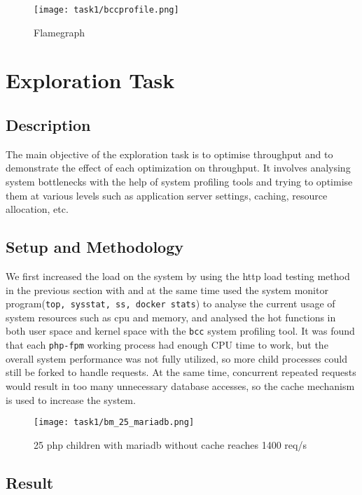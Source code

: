 \begin{figure}
\centering 
\texttt{[image: task1/bccprofile.png]}
\caption{Flamegraph} 
\label{flamegraph}
\end{figure}

\section{Exploration Task}

\subsection{Description}

The main objective of the exploration task is to optimise throughput and to demonstrate the effect of each optimization on throughput. It involves analysing system bottlenecks with the help of system profiling tools and trying to optimise them at various levels such as application server settings, caching, resource allocation, etc.

\subsection{Setup and Methodology}

We first increased the load on the system by using the http load testing method in the previous section with  and at the same time used the system monitor program(\texttt{top, sysstat, ss, docker stats}) to analyse the current usage of system resources such as cpu and memory, and analysed the hot functions in both user space and kernel space with the \texttt{bcc} system profiling tool. It was found that each \texttt{php-fpm} working process had enough CPU time to work, but the overall system performance was not fully utilized, so more child processes could still be forked to handle requests. At the same time, concurrent repeated requests would result in too many unnecessary database accesses, so the cache mechanism is used to increase the system.

\begin{figure}
\centering 
\texttt{[image: task1/bm\_25\_mariadb.png]}
\caption{25 php children with mariadb without cache reaches 1400 req/s} 
\label{bm_25_mariadb}
\end{figure}

\subsection{Result}

